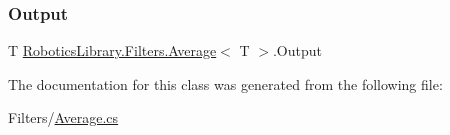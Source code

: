 \subsubsection{\texorpdfstring{Output}{Output}}
{\footnotesize\ttfamily T \hyperlink{class_robotics_library_1_1_filters_1_1_average}{Robotics\+Library.\+Filters.\+Average}$<$ T $>$.Output\hspace{0.3cm}{\ttfamily [get]}}



The documentation for this class was generated from the following file\+:\begin{DoxyCompactItemize}
\item 
Filters/\hyperlink{_average_8cs}{Average.\+cs}\end{DoxyCompactItemize}
